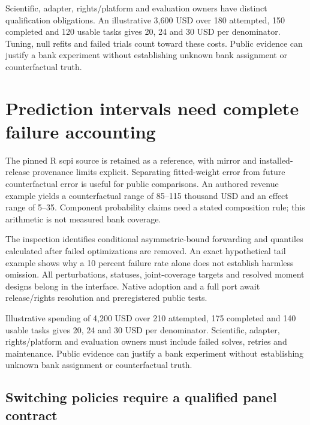 Scientific, adapter, rights/platform and evaluation owners have distinct
qualification obligations. An illustrative 3,600 USD over 180 attempted,
150 completed and 120 usable tasks gives 20, 24 and 30 USD per
denominator. Tuning, null refits and failed trials count toward these
costs. Public evidence can justify a bank experiment without
establishing unknown bank assignment or counterfactual truth.
\citep{exec24_augsynth_choice}

\hypertarget{prediction-intervals-need-complete-failure-accounting}{%
\section{Prediction intervals need complete failure
accounting}\label{prediction-intervals-need-complete-failure-accounting}}

The pinned R scpi source is retained as a reference, with mirror and
installed-release provenance limits explicit. Separating fitted-weight
error from future counterfactual error is useful for public comparisons.
An authored revenue example yields a counterfactual range of 85--115
thousand USD and an effect range of 5--35. Component probability claims
need a stated composition rule; this arithmetic is not measured bank
coverage. \citep{exec24_scpi_source,exec24_scpi_choice}

The inspection identifies conditional asymmetric-bound forwarding and
quantiles calculated after failed optimizations are removed. An exact
hypothetical tail example shows why a 10 percent failure rate alone does
not establish harmless omission. All perturbations, statuses,
joint-coverage targets and resolved moment designs belong in the
interface. Native adoption and a full port await release/rights
resolution and preregistered public tests.
\citep{exec24_scpi_source,exec24_scpi_choice}

Illustrative spending of 4,200 USD over 210 attempted, 175 completed and
140 usable tasks gives 20, 24 and 30 USD per denominator. Scientific,
adapter, rights/platform and evaluation owners must include failed
solves, retries and maintenance. Public evidence can justify a bank
experiment without establishing unknown bank assignment or
counterfactual truth. \citep{exec24_scpi_choice}

\hypertarget{switching-policies-require-a-qualified-panel-contract}{%
\subsection{Switching policies require a qualified panel
contract}\label{switching-policies-require-a-qualified-panel-contract}}

